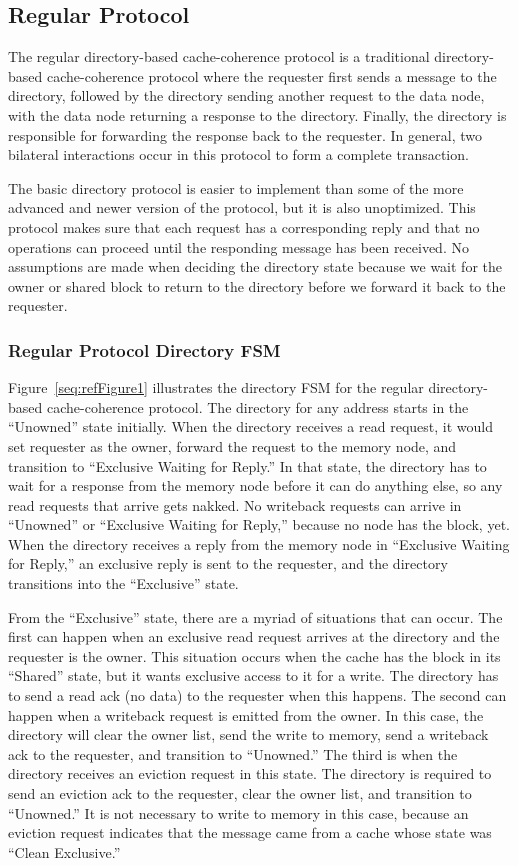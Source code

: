 \documentclass[letterpaper]{article}
\newcounter{Figure}
\begin{document}
\subsection{Regular Protocol}
The regular directory-based cache-coherence protocol is a traditional directory-based cache-coherence protocol where the requester first sends a message to the directory, followed by the directory sending another request to the data node, with the data node returning a response to the directory. Finally, the directory is responsible for forwarding the response back to the requester. In general, two bilateral interactions occur in this protocol to form a complete transaction.

The basic directory protocol is easier to implement than some of the more advanced and newer version of the protocol, but it is also unoptimized. This protocol makes sure that each request has a corresponding reply and that no operations can proceed until the responding message has been received. No assumptions are made when deciding the directory state because we wait for the owner or shared block to return to the directory before we forward it back to the requester.

\subsubsection{Regular Protocol Directory FSM}
Figure~\ref{seq:refFigure1} illustrates the directory FSM for the regular directory-based cache-coherence protocol. The directory for any address starts in the ``Unowned'' state initially. When the directory receives a read request, it would set requester as the owner, forward the request to the memory node, and transition to ``Exclusive Waiting for Reply.'' In that state, the directory has to wait for a response from the memory node before it can do anything else, so any read requests that arrive gets nakked. No writeback requests can arrive in ``Unowned'' or ``Exclusive Waiting for Reply,'' because no node has the block, yet. When the directory receives a reply from the memory node in ``Exclusive Waiting for Reply,'' an exclusive reply is sent to the requester, and the directory transitions into the ``Exclusive'' state.

From the ``Exclusive'' state, there are a myriad of situations that can occur. The first can happen when an exclusive read request arrives at the directory and the requester is the owner. This situation occurs when the cache has the block in its ``Shared'' state, but it wants exclusive access to it for a write. The directory has to send a read ack (no data) to the requester when this happens. The second can happen when a writeback request is emitted from the owner. In this case, the directory will clear the owner list, send the write to memory, send a writeback ack to the requester, and transition to ``Unowned.'' The third is when the directory receives an eviction request in this state. The directory is required to send an eviction ack to the requester, clear the owner list, and transition to ``Unowned.'' It is not necessary to write to memory in this case, because an eviction request indicates that the message came from a cache whose state was ``Clean Exclusive.''
\end{document}

